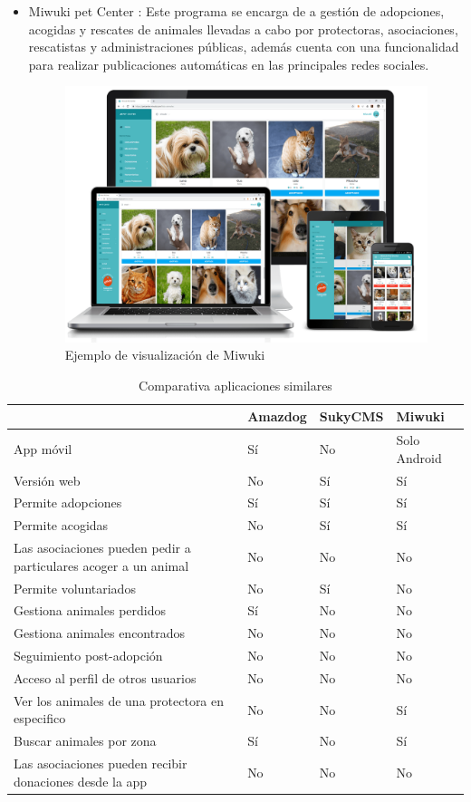 \begin{itemize}
	\item Miwuki pet Center \cite{miwuki}: Este programa se encarga de a gestión de adopciones, acogidas y rescates de animales llevadas a cabo por protectoras, asociaciones, rescatistas y administraciones públicas, además cuenta con una funcionalidad para realizar publicaciones automáticas en las principales redes sociales.
	 
\begin{figure}[H]
	\centering
	\includegraphics[width=0.7\linewidth]{"Sprint 0/miwuki"}
	\caption{Ejemplo de visualización de Miwuki}
	\label{fig:miwuki}
\end{figure}

\end{itemize}

\begin{table}[H] %
	\centering
	\begin{tabular}{|p{5cm}|l|l|l|} \hline 
		 & \textbf{Amazdog} & \textbf{SukyCMS} & \textbf{Miwuki} \\ \hline
		App móvil & Sí & No & Solo Android \\ \hline
		Versión web & No & Sí &  Sí \\ \hline
		Permite adopciones & Sí & Sí & Sí \\ \hline
		Permite acogidas & No & Sí & Sí \\ \hline
		Las asociaciones pueden pedir a particulares acoger a un animal & No & No & No \\ \hline
		Permite voluntariados & No & Sí & No \\ \hline
		Gestiona animales perdidos & Sí & No & No \\ \hline
		Gestiona animales encontrados & No & No & No \\ \hline
		Seguimiento post-adopción & No & No & No \\ \hline
		Acceso al perfil de otros usuarios & No & No & No \\ \hline
		Ver los animales de una protectora en especifico & No & No & Sí \\ \hline
		Buscar animales por zona & Sí & No & Sí \\ \hline
		Las asociaciones pueden recibir donaciones desde la app & No & No & No \\ \hline
		
		
		
    \end{tabular}
		\caption{Comparativa aplicaciones similares}
		\label{tab:appsSimilares}
	\end{table}